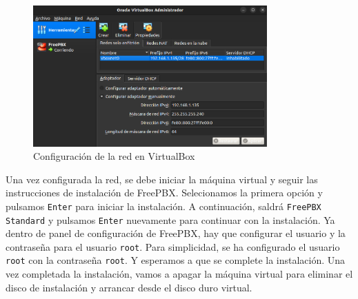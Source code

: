 \begin{figure}[H]
	\centering
	\includegraphics[width=0.8\textwidth]{images/freepbx_virtualbox_3.png}
	\caption{Configuración de la red en VirtualBox}
	\label{fig:freepbx_virtualbox_red}
\end{figure}

\noindent
Una vez configurada la red, se debe iniciar la máquina virtual y seguir las instrucciones de instalación de FreePBX. Selecionamos la primera opción y pulsamos \texttt{Enter} para iniciar la instalación. A continuación, saldrá \texttt{FreePBX Standard} y pulsamos \texttt{Enter} nuevamente para continuar con la instalación. Ya dentro de panel de configuración de FreePBX, hay que configurar el usuario y la contraseña para el usuario \texttt{root}. Para simplicidad, se ha configurado el usuario \texttt{root} con la contraseña \texttt{root}. Y esperamos a que se complete la instalación. Una vez completada la instalación, vamos a apagar la máquina virtual para eliminar el disco de instalación y arrancar desde el disco duro virtual.

